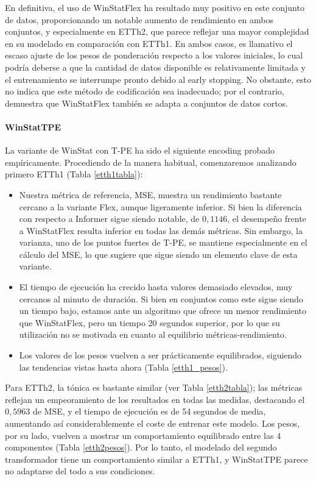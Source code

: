  En definitiva, el uso de WinStatFlex ha resultado muy positivo en este conjunto de datos, proporcionando un notable aumento de rendimiento en ambos conjuntos, y especialmente en ETTh2, que parece reflejar una mayor complejidad en su modelado en comparación con ETTh1. En ambos casos, es llamativo el escaso ajuste de los pesos de ponderación respecto a los valores iniciales, lo cual podría deberse a que la cantidad de datos disponible es relativamente limitada y el entrenamiento se interrumpe pronto debido al early stopping. No obstante, esto no indica que este método de codificación sea inadecuado; por el contrario, demuestra que WinStatFlex también se adapta a conjuntos de datos cortos.
 
 \paragraph{WinStatTPE}
 
 La variante de WinStat con T-PE ha sido el siguiente encoding probado empíricamente. Procediendo de la manera habitual, comenzaremos analizando primero ETTh1 (Tabla \ref{etth1tabla}):
 
 \begin{itemize}
 	\item Nuestra métrica de referencia, MSE, muestra un rendimiento bastante cercano a la variante Flex, aunque ligeramente inferior. Si bien la diferencia con respecto a Informer sigue siendo notable, de $0,1146$, el desempeño frente a WinStatFlex resulta inferior en todas las demás métricas. Sin embargo, la varianza, uno de los puntos fuertes de T-PE, se mantiene especialmente en el cálculo del MSE, lo que sugiere que sigue siendo un elemento clave de esta variante.
 	
 	\item El tiempo de ejecución ha crecido hasta valores demasiado elevados, muy cercanos al minuto de duración. Si bien en conjuntos como este sigue siendo un tiempo bajo, estamos ante un algoritmo que ofrece un menor rendimiento que WinStatFlex, pero un tiempo 20 segundos superior, por lo que su utilización no se motivada en cuanto al equilibrio métricas-rendimiento.
 	\item Los valores de los pesos vuelven a ser prácticamente equilibrados, siguiendo las tendencias vistas hasta ahora (Tabla \ref{etth1_pesos}).
 \end{itemize}
 
 Para ETTh2, la tónica es bastante similar (ver Tabla \ref{etth2tabla}); las métricas reflejan un empeoramiento de los resultados en todas las medidas, destacando el $0,5963$ de MSE, y el tiempo de ejecución es de 54 segundos de media, aumentando así considerablemente el coste de entrenar este modelo. Los pesos, por su lado, vuelven a mostrar un comportamiento equilibrado entre las 4 componentes (Tabla \ref{etth2pesos}). Por lo tanto, el modelado del segundo transformador tiene un comportamiento similar a ETTh1, y WinStatTPE parece no adaptarse del todo a sus condiciones.\\
 
